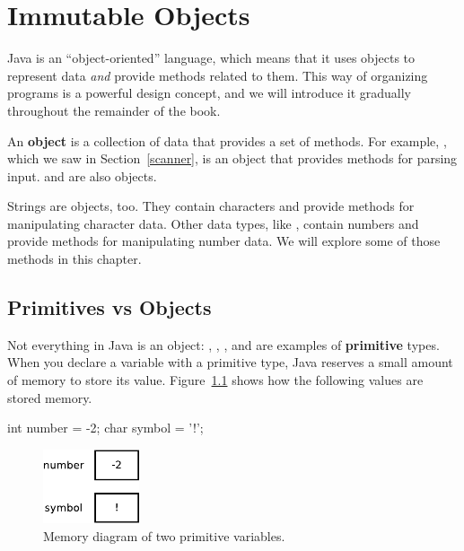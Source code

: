 \chapter{Immutable Objects}
\label{immutable}


Java is an ``object-oriented'' language, which means that it uses objects to represent data {\em and} provide methods related to them.
This way of organizing programs is a powerful design concept, and we will introduce it gradually throughout the remainder of the book.


An {\bf object} is a collection of data that provides a set of methods.
For example, , which we saw in Section~\ref{scanner}, is an object that provides methods for parsing input.
 and  are also objects.

Strings are objects, too.
They contain characters and provide methods for manipulating character data.
Other data types, like , contain numbers and provide methods for manipulating number data.
We will explore some of those methods in this chapter.


\section{Primitives vs Objects}


Not everything in Java is an object: , , , and  are examples of {\bf primitive} types.
When you declare a variable with a primitive type, Java reserves a small amount of memory to store its value.
Figure~\ref{fig.mem1} shows how the following values are stored memory.

\begin{code}
int number = -2;
char symbol = '!';
\end{code}

\begin{figure}[!ht]
\begin{center}
\includegraphics[width=80pt]{figs/mem1.pdf}
\caption{Memory diagram of two primitive variables.}
\label{fig.mem1}
\end{center}
\end{figure}

